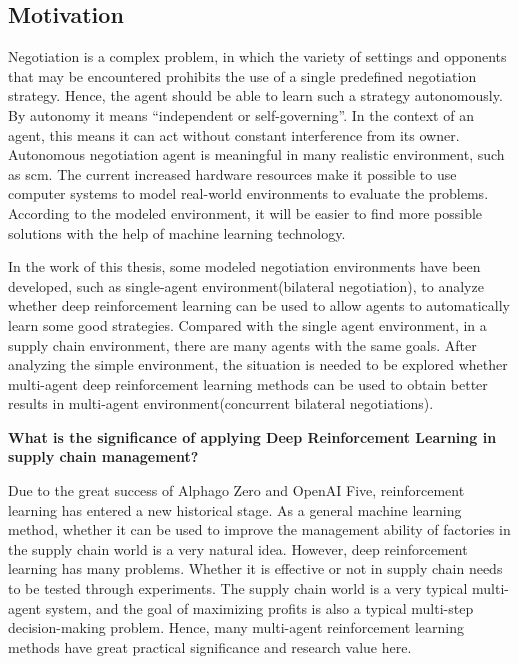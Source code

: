 \subsection{Motivation}
Negotiation is a complex problem, in which the variety of settings and opponents that may be encountered prohibits the use of a single predefined negotiation strategy. Hence, the agent should be able to learn such a strategy autonomously\parencite{Bakker2019RLBOAAM}. By autonomy it means “independent or self-governing”. In the context of an agent, this means it can act without constant interference from its owner\parencite{Fetch.ai2019}. Autonomous negotiation agent is meaningful in many realistic environment, such as \gls{scm}. The current increased hardware resources make it possible to use computer systems to model real-world environments to evaluate the problems. According to the modeled environment, it will be easier to find more possible solutions with the help of machine learning technology.

In the work of this thesis, some modeled negotiation environments have been developed, such as single-agent environment(bilateral negotiation), to analyze whether deep reinforcement learning can be used to allow agents to automatically learn some good strategies. Compared with the single agent environment, in a supply chain environment, there are many agents with the same goals. After analyzing the simple environment, the situation is needed to be explored whether multi-agent deep reinforcement learning methods can be used to obtain better results in multi-agent environment(concurrent bilateral negotiations).

\textbf{What is the significance of applying Deep Reinforcement Learning in supply chain management?}

Due to the great success of Alphago Zero\parencite{Silver2017} and OpenAI Five\parencite{OpenAI2019}, reinforcement learning has entered a new historical stage. As a general machine learning method, whether it can be used to improve the management ability of factories in the supply chain world is a very natural idea. However, deep reinforcement learning has many problems. Whether it is effective or not in supply chain needs to be tested through experiments. The supply chain world is a very typical multi-agent system, and the goal of maximizing profits is also a typical multi-step decision-making problem. Hence, many multi-agent reinforcement learning methods have great practical significance and research value here.

